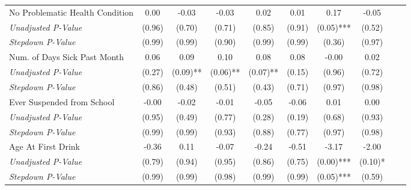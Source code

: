 \begin{tabular}{l c c c c c c c c c}
No Problematic Health Condition & 0.00 & -0.03 & -0.03 & 0.02 & 0.01 & 0.17 & -0.05 \\
\quad \textit{Unadjusted P-Value} & (0.96) & (0.70) & (0.71) & (0.85) & (0.91) & (0.05)*** & (0.52) \\
\quad \textit{Stepdown P-Value} & (0.99) & (0.99) & (0.90) & (0.99) & (0.99) & (0.36) & (0.97) \\
Num. of Days Sick Past Month & 0.06 & 0.09 & 0.10 & 0.08 & 0.08 & -0.00 & 0.02 \\
\quad \textit{Unadjusted P-Value} & (0.27) & (0.09)** & (0.06)** & (0.07)** & (0.15) & (0.96) & (0.72) \\
\quad \textit{Stepdown P-Value} & (0.86) & (0.48) & (0.51) & (0.43) & (0.71) & (0.97) & (0.98) \\
Ever Suspended from School & -0.00 & -0.02 & -0.01 & -0.05 & -0.06 & 0.01 & 0.00 \\
\quad \textit{Unadjusted P-Value} & (0.95) & (0.49) & (0.77) & (0.28) & (0.19) & (0.68) & (0.93) \\
\quad \textit{Stepdown P-Value} & (0.99) & (0.99) & (0.93) & (0.88) & (0.77) & (0.97) & (0.98) \\
Age At First Drink & -0.36 & 0.11 & -0.07 & -0.24 & -0.51 & -3.17 & -2.00 \\
\quad \textit{Unadjusted P-Value} & (0.79) & (0.94) & (0.95) & (0.86) & (0.75) & (0.00)*** & (0.10)* \\
\quad \textit{Stepdown P-Value} & (0.99) & (0.99) & (0.98) & (0.99) & (0.99) & (0.05)*** & (0.59) \\
\bottomrule
\end{tabular}
